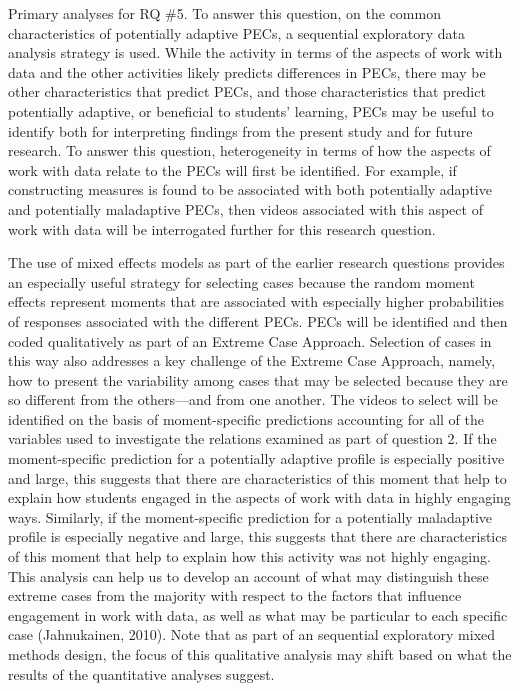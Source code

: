 \documentclass[]{msu-thesis}
\theoremstyle{definition}
\theoremstyle{definition}
\theoremstyle{definition}
\theoremstyle{remark}
\begin{document}
Primary analyses for RQ \#5. To answer this question, on the common
characteristics of potentially adaptive PECs, a sequential exploratory
data analysis strategy is used. While the activity in terms of the
aspects of work with data and the other activities likely predicts
differences in PECs, there may be other characteristics that predict
PECs, and those characteristics that predict potentially adaptive, or
beneficial to students' learning, PECs may be useful to identify both
for interpreting findings from the present study and for future
research. To answer this question, heterogeneity in terms of how the
aspects of work with data relate to the PECs will first be identified.
For example, if constructing measures is found to be associated with
both potentially adaptive and potentially maladaptive PECs, then videos
associated with this aspect of work with data will be interrogated
further for this research question.

The use of mixed effects models as part of the earlier research
questions provides an especially useful strategy for selecting cases
because the random moment effects represent moments that are associated
with especially higher probabilities of responses associated with the
different PECs. PECs will be identified and then coded qualitatively as
part of an Extreme Case Approach. Selection of cases in this way also
addresses a key challenge of the Extreme Case Approach, namely, how to
present the variability among cases that may be selected because they
are so different from the others---and from one another. The videos to
select will be identified on the basis of moment-specific predictions
accounting for all of the variables used to investigate the relations
examined as part of question 2. If the moment-specific prediction for a
potentially adaptive profile is especially positive and large, this
suggests that there are characteristics of this moment that help to
explain how students engaged in the aspects of work with data in highly
engaging ways. Similarly, if the moment-specific prediction for a
potentially maladaptive profile is especially negative and large, this
suggests that there are characteristics of this moment that help to
explain how this activity was not highly engaging. This analysis can
help us to develop an account of what may distinguish these extreme
cases from the majority with respect to the factors that influence
engagement in work with data, as well as what may be particular to each
specific case (Jahnukainen, 2010). Note that as part of an sequential
exploratory mixed methods design, the focus of this qualitative analysis
may shift based on what the results of the quantitative analyses
suggest.
\end{document}
